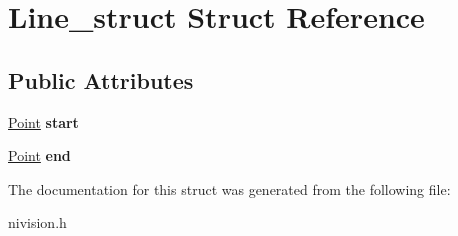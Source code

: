 \hypertarget{structLine__struct}{\section{\-Line\-\_\-struct \-Struct \-Reference}
\label{structLine__struct}
}
\subsection*{\-Public \-Attributes}
\begin{DoxyCompactItemize}
\item 
\hypertarget{structLine__struct_a4188f5cd46478e95d68e378b2b76e0f8}{\hyperlink{structPoint__struct}{\-Point} {\bfseries start}}\label{structLine__struct_a4188f5cd46478e95d68e378b2b76e0f8}

\item 
\hypertarget{structLine__struct_af93af7c83466ef8080d460336bb603d6}{\hyperlink{structPoint__struct}{\-Point} {\bfseries end}}\label{structLine__struct_af93af7c83466ef8080d460336bb603d6}

\end{DoxyCompactItemize}


\-The documentation for this struct was generated from the following file\-:\begin{DoxyCompactItemize}
\item 
nivision.\-h\end{DoxyCompactItemize}

